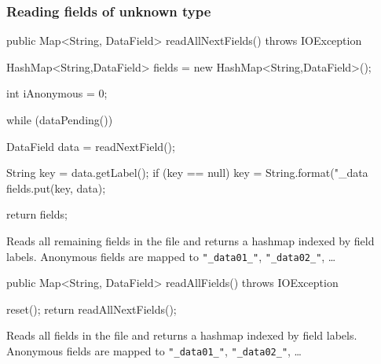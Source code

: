 \subsubsection*{Reading fields of unknown type}
\begin{code}

   public Map<String, DataField> readAllNextFields() throws IOException \begin{hide} {

      HashMap<String,DataField> fields = new HashMap<String,DataField>();
      
      int iAnonymous = 0;
      
      while (dataPending()) {

         DataField data = readNextField();

         String key = data.getLabel();
         if (key == null)
            key = String.format("_data%
         fields.put(key, data);

      }
      
      return fields;
   }
   \end{hide}
\end{code}
\begin{tabb}
Reads all remaining fields in the file and returns a hashmap indexed
by field labels. Anonymous fields are mapped to \verb|"_data01_"|, \verb|"_data02_"|, \ldots
\end{tabb}
\begin{code}

   public Map<String, DataField> readAllFields() throws IOException \begin{hide} {
      reset();
      return readAllNextFields();
   }
   \end{hide}
\end{code}
\begin{tabb}
Reads all fields in the file and returns a hashmap indexed
by field labels. Anonymous fields are mapped to \verb|"_data01_"|, \verb|"_data02_"|,  \ldots
\end{tabb}

\begin{code}\begin{hide}
}
\end{hide}\end{code}
